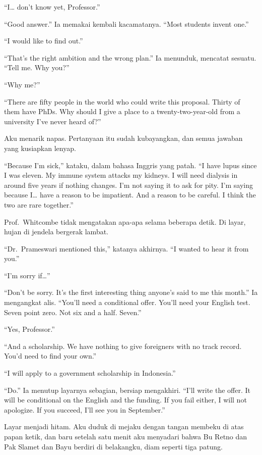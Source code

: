 \documentclass[11pt,twoside,openany]{book}
\begin{document}
``I\ldots{} don't know yet, Professor.''

``Good answer.'' Ia memakai kembali kacamatanya. ``Most students invent one.''

``I would like to find out.''

``That's the right ambition and the wrong plan.'' Ia menunduk, mencatat sesuatu. ``Tell me. Why you?''

``Why me?''

``There are fifty people in the world who could write this proposal. Thirty of them have PhDs. Why should I give a place to a twenty-two-year-old from a university I've never heard of?''

Aku menarik napas. Pertanyaan itu sudah kubayangkan, dan semua jawaban yang kusiapkan lenyap.

``Because I'm sick,'' kataku, dalam bahasa Inggris yang patah. ``I have lupus since I was eleven. My immune system attacks my kidneys. I will need dialysis in around five years if nothing changes. I'm not saying it to ask for pity. I'm saying because I\ldots{} have a reason to be impatient. And a reason to be careful. I think the two are rare together.''

Prof.~Whitcombe tidak mengatakan apa-apa selama beberapa detik. Di layar, hujan di jendela bergerak lambat.

``Dr.~Prameswari mentioned this,'' katanya akhirnya. ``I wanted to hear it from you.''

``I'm sorry if\ldots{}''

``Don't be sorry. It's the first interesting thing anyone's said to me this month.'' Ia mengangkat alis. ``You'll need a conditional offer. You'll need your English test. Seven point zero. Not six and a half. Seven.''

``Yes, Professor.''

``And a scholarship. We have nothing to give foreigners with no track record. You'd need to find your own.''

``I will apply to a government scholarship in Indonesia.''

``Do.'' Ia menutup layarnya sebagian, bersiap mengakhiri. ``I'll write the offer. It will be conditional on the English and the funding. If you fail either, I will not apologize. If you succeed, I'll see you in September.''

Layar menjadi hitam. Aku duduk di mejaku dengan tangan membeku di atas papan ketik, dan baru setelah satu menit aku menyadari bahwa Bu Retno dan Pak Slamet dan Bayu berdiri di belakangku, diam seperti tiga patung.
\end{document}
